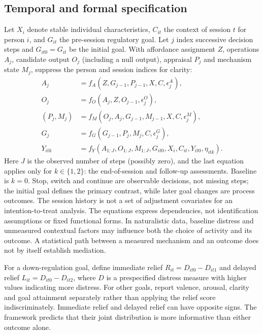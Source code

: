 \documentclass[11pt,a4paper]{article}
\begin{document}
\subsection{Temporal and formal specification}
Let $X_i$ denote stable individual characteristics, $C_{it}$ the context of session $t$ for person $i$, and $G_{it}$ the pre-session regulatory goal. Let $j$ index successive decision steps and $G_{it0}=G_{it}$ be the initial goal. With affordance assignment $Z$, operations $A_j$, candidate output $O_j$ (including a null output), appraisal $P_j$ and mechanism state $M_j$, suppress the person and session indices for clarity:
\begin{align}
 A_j &= f_A(Z,G_{j-1},P_{j-1},X,C,\epsilon_j^A),\\
 O_j &= f_O(A_j,Z,O_{j-1},\epsilon_j^O),\\
 (P_j,M_j)&= f_M(O_j,A_j,G_{j-1},M_{j-1},X,C,\epsilon_j^M),\\
 G_j &= f_G(G_{j-1},P_j,M_j,C,\epsilon_j^G),\\
 Y_{itk}&=f_Y(A_{1:J},O_{1:J},M_{1:J},G_{it0},X_i,C_{it},Y_{it0},\eta_{itk}).
\end{align}
Here $J$ is the observed number of steps (possibly zero), and the last equation applies only for $k\in\{1,2\}$: the end-of-session and follow-up assessments. Baseline is $k=0$. Stop, switch and continue are observable decisions, not missing steps; the initial goal defines the primary contrast, while later goal changes are process outcomes. The session history is not a set of adjustment covariates for an intention-to-treat analysis. The equations express dependencies, not identification assumptions or fixed functional forms. In naturalistic data, baseline distress and unmeasured contextual factors may influence both the choice of activity and its outcome. A statistical path between a measured mechanism and an outcome does not by itself establish mediation.

For a down-regulation goal, define immediate relief $R_{it}=D_{it0}-D_{it1}$ and delayed relief $L_{it}=D_{it0}-D_{it2}$, where $D$ is a prespecified distress measure with higher values indicating more distress. For other goals, report valence, arousal, clarity and goal attainment separately rather than applying the relief score indiscriminately. Immediate relief and delayed relief can have opposite signs. The framework predicts that their joint distribution is more informative than either outcome alone.
\end{document}
